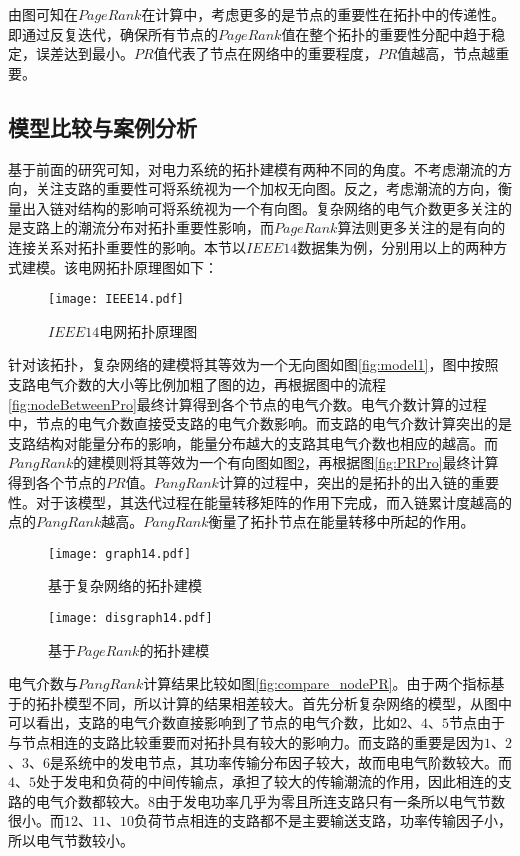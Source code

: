 由图可知在$PageRank$在计算中，考虑更多的是节点的重要性在拓扑中的传递性。即通过反复迭代，确保所有节点的$PageRank$值在整个拓扑的重要性分配中趋于稳定，误差达到最小。$PR$值代表了节点在网络中的重要程度，$PR$值越高，节点越重要。

\subsection{模型比较与案例分析}
基于前面的研究可知，对电力系统的拓扑建模有两种不同的角度。不考虑潮流的方向，关注支路的重要性可将系统视为一个加权无向图。反之，考虑潮流的方向，衡量出入链对结构的影响可将系统视为一个有向图。复杂网络的电气介数更多关注的是支路上的潮流分布对拓扑重要性影响，而$PageRank$算法则更多关注的是有向的连接关系对拓扑重要性的影响。本节以$IEEE14$数据集为例，分别用以上的两种方式建模。该电网拓扑原理图如下：
\begin{figure}[H] %
  \centering
  \texttt{[image: IEEE14.pdf]}
  \caption{$IEEE14$电网拓扑原理图}
  \label{fig:fundement14}
\end{figure}

针对该拓扑，复杂网络的建模将其等效为一个无向图如图\ref{fig:model1}，图中按照支路电气介数的大小等比例加粗了图的边，再根据图中的流程\ref{fig:nodeBetweenPro}最终计算得到各个节点的电气介数。电气介数计算的过程中，节点的电气介数直接受支路的电气介数影响。而支路的电气介数计算突出的是支路结构对能量分布的影响，能量分布越大的支路其电气介数也相应的越高。而$PangRank$的建模则将其等效为一个有向图如图\ref{fig:model2}，再根据图\ref{fig:PRPro}最终计算得到各个节点的$PR$值。$PangRank$计算的过程中，突出的是拓扑的出入链的重要性。对于该模型，其迭代过程在能量转移矩阵的作用下完成，而入链累计度越高的点的$PangRank$越高。$PangRank$衡量了拓扑节点在能量转移中所起的作用。
\begin{figure}[H]
\begin{minipage}{0.48\textwidth}
  \centering
  \texttt{[image: graph14.pdf]}
  \caption{基于复杂网络的拓扑建模}
  \label{fig:model1}
\end{minipage}\hfill
\begin{minipage}{0.48\textwidth}
  \centering
  \texttt{[image: disgraph14.pdf]}
  \caption{基于$PageRank$的拓扑建模}
  \label{fig:model2}
\end{minipage}
\end{figure}
电气介数与$PangRank$计算结果比较如图\ref{fig:compare_nodePR}。由于两个指标基于的拓扑模型不同，所以计算的结果相差较大。首先分析复杂网络的模型，从图中可以看出，支路的电气介数直接影响到了节点的电气介数，比如$2$、$4$、$5$节点由于与节点相连的支路比较重要而对拓扑具有较大的影响力。而支路的重要是因为$1$、$2$、$3$、$6$是系统中的发电节点，其功率传输分布因子较大，故而电电气阶数较大。而$4$、$5$处于发电和负荷的中间传输点，承担了较大的传输潮流的作用，因此相连的支路的电气介数都较大。$8$由于发电功率几乎为零且所连支路只有一条所以电气节数很小。而$12$、$11$、$10$负荷节点相连的支路都不是主要输送支路，功率传输因子小，所以电气节数较小。

